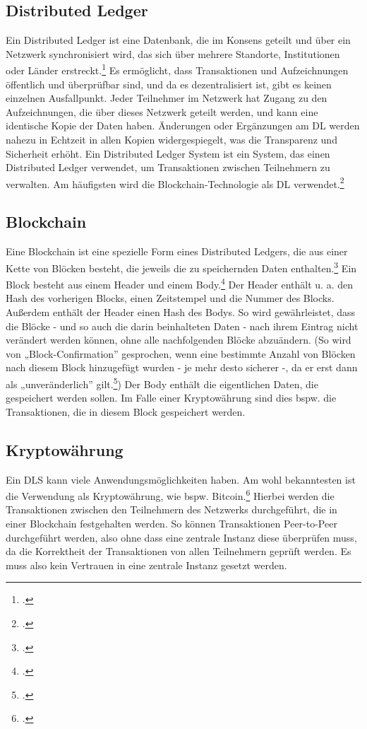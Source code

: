 \documentclass[12pt, a4paper]{article}
\begin{document}
{\subsection{Distributed Ledger}
\label{sec:definition-distributed-ledger}
Ein Distributed Ledger ist eine Datenbank, die im Konsens geteilt und über ein Netzwerk synchronisiert wird, das sich über mehrere Standorte, Institutionen oder Länder erstreckt.\footcite[Vgl. hierzu und zum Folgenden][]{w1,w2} 
Es ermöglicht, dass Transaktionen und Aufzeichnungen öffentlich und überprüfbar sind, und da es dezentralisiert ist, gibt es keinen einzelnen Ausfallpunkt. 
Jeder Teilnehmer im Netzwerk hat Zugang zu den Aufzeichnungen, die über dieses Netzwerk geteilt werden, und kann eine identische Kopie der Daten haben. Änderungen oder Ergänzungen am DL werden nahezu in Echtzeit in allen Kopien widergespiegelt, was die Transparenz und Sicherheit erhöht.
\bigbreak
\noindent
Ein Distributed Ledger System ist ein System, das einen Distributed Ledger verwendet, um Transaktionen zwischen Teilnehmern zu verwalten. Am häufigsten wird die Blockchain-Technologie als DL verwendet.\footcite[Vgl.][]{w3}
\subsection{Blockchain}
\label{sec:definition-blockchain}
Eine Blockchain ist eine spezielle Form eines Distributed Ledgers, die aus einer Kette von Blöcken besteht, die jeweils die zu speichernden Daten enthalten.\footcite[Vgl.][16]{q3} 
Ein Block besteht aus einem Header und einem Body.\footcites[Vgl. hierzu und zum Folgenden][S. 161 ff\adddot]{q5}[]{w9}
\bigbreak
\noindent
Der Header enthält u. a. den Hash des vorherigen Blocks, einen Zeitstempel und die Nummer des Blocks.
Außerdem enthält der Header einen Hash des Bodys.
So wird gewährleistet, dass die Blöcke - und so auch die darin beinhalteten Daten - nach ihrem Eintrag nicht verändert werden können, ohne alle nachfolgenden Blöcke abzuändern. 
(So wird von „Block-Confirmation” gesprochen, wenn eine bestimmte Anzahl von Blöcken nach diesem Block hinzugefügt wurden - je mehr desto sicherer -, da er erst dann als „unveränderlich” gilt.\footcites[Vgl.][191]{q5})
\bigbreak
\noindent
Der Body enthält die eigentlichen Daten, die gespeichert werden sollen. Im Falle einer Kryptowährung sind dies bspw. die Transaktionen, die in diesem Block gespeichert werden.
\subsection{Kryptowährung}
\label{sec:definition-kryptowaehrung}
Ein DLS kann viele Anwendungsmöglichkeiten haben. Am wohl bekanntesten ist die Verwendung als Kryptowährung, wie bspw. Bitcoin.\footcite[Vgl. hierzu und zum Folgenden][1]{q4} 
Hierbei werden die Transaktionen zwischen den Teilnehmern des Netzwerks durchgeführt, die in einer Blockchain festgehalten werden. 
So können Transaktionen Peer-to-Peer durchgeführt werden, also ohne dass eine zentrale Instanz diese überprüfen muss, da die Korrektheit der Transaktionen von allen Teilnehmern geprüft werden.
Es muss also kein Vertrauen in eine zentrale Instanz gesetzt werden.
}
\end{document}
